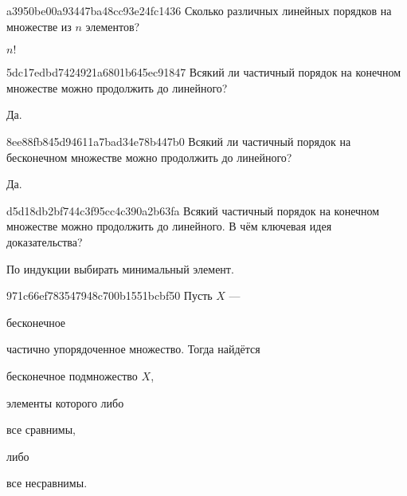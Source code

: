 \begin{note}{a3950be00a93447ba48cc93e24fc1436}
    Сколько различных линейных порядков на множестве из \({ n }\) элементов?

    \begin{cloze}{1}
        \({ n! }\)
    \end{cloze}
\end{note}

\begin{note}{5dc17edbd7424921a6801b645ec91847}
    Всякий ли частичный порядок на конечном множестве можно продолжить до линейного?

    \begin{cloze}{1}
        Да.
    \end{cloze}
\end{note}

\begin{note}{8ee88fb845d94611a7bad34e78b447b0}
    Всякий ли частичный порядок на бесконечном множестве можно продолжить до линейного?

    \begin{cloze}{1}
        Да.
    \end{cloze}
\end{note}

\begin{note}{d5d18db2bf744c3f95cc4c390a2b63fa}
    Всякий частичный порядок на конечном множестве можно продолжить до линейного.
    В чём ключевая идея доказательства?

    \begin{cloze}{1}
        По индукции выбирать минимальный элемент.
    \end{cloze}
\end{note}

\begin{note}{971c66ef783547948c700b1551bcbf50}
    Пусть \({ X }\) --- \begin{icloze}{3}бесконечное\end{icloze} частично упорядоченное множество.
    Тогда найдётся \begin{icloze}{2}бесконечное подмножество \({ X }\),\end{icloze} элементы которого либо \begin{icloze}{1}все сравнимы,\end{icloze} либо \begin{icloze}{2}все несравнимы.\end{icloze}
\end{note}

